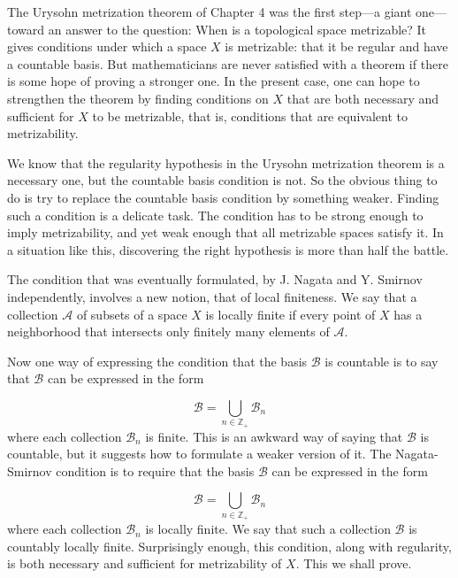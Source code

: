 
The Urysohn metrization theorem of Chapter 4 was the first step---a giant one---toward an answer to the question: When is a topological space metrizable? It gives conditions under which a space \(X\) is metrizable: that it be regular and have a countable basis. But mathematicians are never satisfied with a theorem if there is some hope of proving a stronger one. In the present case, one can hope to strengthen the theorem by finding conditions on \(X\) that are both necessary and sufficient for \(X\) to be metrizable, that is, conditions that are equivalent to metrizability.

We know that the regularity hypothesis in the Urysohn metrization theorem is a necessary one, but the countable basis condition is not. So the obvious thing to do is try to replace the countable basis condition by something weaker. Finding such a condition is a delicate task. The condition has to be strong enough to imply metrizability, and yet weak enough that all metrizable spaces satisfy it. In a situation like this, discovering the right hypothesis is more than half the battle.

The condition that was eventually formulated, by J. Nagata and Y. Smirnov independently, involves a new notion, that of local finiteness. We say that a collection \(\mathcal{A}\) of subsets of a space \(X\) is locally finite if every point of \(X\) has a neighborhood that intersects only finitely many elements of \(\mathcal{A}\).

Now one way of expressing the condition that the basis \(\mathcal{B}\) is countable is to say that \(\mathcal{B}\) can be expressed in the form

\[
\mathcal{B} = \mathop{\bigcup }\limits_{{n \in {\mathbb{Z}}_{ + }}}\mathcal{B}_{n}
\]
where each collection \(\mathcal{B}_{n}\) is finite. This is an awkward way of saying that \(\mathcal{B}\) is countable, but it suggests how to formulate a weaker version of it. The Nagata-Smirnov condition is to require that the basis \(\mathcal{B}\) can be expressed in the form

\[
\mathcal{B} = \mathop{\bigcup }\limits_{{n \in {\mathbb{Z}}_{ + }}}\mathcal{B}_{n}
\]
where each collection \(\mathcal{B}_{n}\) is locally finite. We say that such a collection \(\mathcal{B}\) is countably locally finite. Surprisingly enough, this condition, along with regularity, is both necessary and sufficient for metrizability of \(X\). This we shall prove.


